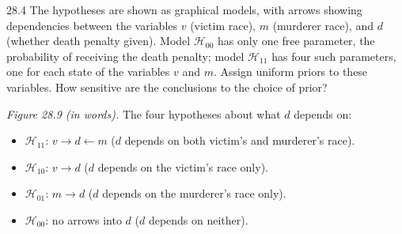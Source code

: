 \documentclass[12pt, a4paper]{article}
\begin{document}
\begin{prob}{28.4}
The hypotheses are shown as graphical models, with arrows showing dependencies between the variables $v$ (victim race), $m$ (murderer race), and $d$ (whether death penalty given). Model $\mathcal{H}_{00}$ has only one free parameter, the probability of receiving the death penalty; model $\mathcal{H}_{11}$ has four such parameters, one for each state of the variables $v$ and $m$. Assign uniform priors to these variables. How sensitive are the conclusions to the choice of prior?

\medskip
\noindent\emph{Figure 28.9 (in words).} The four hypotheses about what $d$ depends on:
\begin{itemize}[nosep]
    \item $\mathcal{H}_{11}$: $v \rightarrow d \leftarrow m$ ($d$ depends on both victim's and murderer's race).
    \item $\mathcal{H}_{10}$: $v \rightarrow d$ ($d$ depends on the victim's race only).
    \item $\mathcal{H}_{01}$: $m \rightarrow d$ ($d$ depends on the murderer's race only).
    \item $\mathcal{H}_{00}$: no arrows into $d$ ($d$ depends on neither).
\end{itemize}
\end{prob}
\begin{sol}
\end{sol}
\bigskip
\end{document}

